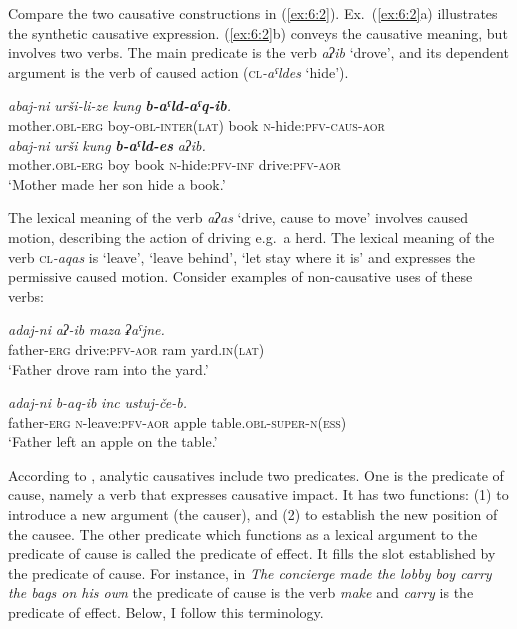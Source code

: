 ﻿\documentclass[output=paper]{langsci/langscibook}
\begin{document}
Compare the two causative constructions in (\ref{ex:6:2}). Ex.~(\ref{ex:6:2}a)
illustrates the synthetic causative expression. (\ref{ex:6:2}b) conveys the
causative meaning, but involves two verbs. The main predicate is the
verb \emph{aʔib} `drove', and its dependent argument is the verb of
caused action (\textsc{cl}\emph{-aˤldes} `hide').

\ea \label{ex:6:2} %
\ea %
\gll \emph{abaj-ni} \emph{urši-li-ze} \emph{kung} \emph{\textbf{b-aˤld-aˤq-ib}.}\\
mother.\textsc{obl}-\textsc{erg} boy-\textsc{obl}-\textsc{inter}(\textsc{lat}) book \textsc{n}-hide:\textsc{pfv}-\textsc{caus}-\textsc{aor}\\

\ex %
\gll \emph{abaj-ni} \emph{urši} \emph{kung} \emph{\textbf{b-aˤld-es}} \emph{aʔib.}\\
mother.\textsc{obl}-\textsc{erg} boy book \textsc{n}-hide:\textsc{pfv}-\textsc{inf} drive:\textsc{pfv}-\textsc{aor}\\
\glt `Mother made her son hide a book.'
\z
\z

{
The lexical meaning of the verb \emph{aʔas} `drive, cause to move'
involves caused motion, describing the action
of driving e.g.\ a herd. The lexical meaning of the verb
\textsc{cl}\emph{-aqas} is `leave', `leave behind', `let stay where it
is' and expresses the permissive caused motion. Consider examples of
non-causative uses of these verbs:}

\ea %
\gll \emph{adaj-ni} \emph{aʔ-ib} \emph{maza} \emph{ʡaˤjne.}\\
father-\textsc{erg} drive:\textsc{pfv}-\textsc{aor} ram yard.\textsc{in}(\textsc{lat})\\
\glt `Father drove ram into the yard.'

\ex %
\gll \emph{adaj-ni} \emph{b-aq-ib} \emph{inc} \emph{ustuj-če-b.}\\
father-\textsc{erg} \textsc{n}-leave:\textsc{pfv}-\textsc{aor} apple table.\textsc{obl}-\textsc{super}-\textsc{n}(\textsc{ess})\\
\glt `Father left an apple on the table.'
\z

According to \citet{song2001}, analytic causatives include two predicates.
One is the {predicate of cause}, namely a verb that
expresses causative impact. It has two functions: (1) to introduce a new
argument (the causer), and (2) to establish the new position of the
causee. The other predicate which functions as a lexical argument to the
predicate of cause is called the {predicate of effect}. It fills
the slot established by the predicate of cause. For instance, in
\emph{The concierge made the lobby boy carry the bags on his own}
the predicate of cause is the verb \emph{make} and \emph{carry} is the
predicate of effect. Below, I follow this terminology.
\end{document}
